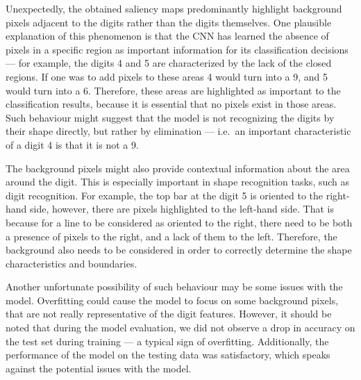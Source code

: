 \documentclass[journal, a4paper]{IEEEtran}
\begin{document}
Unexpectedly, the obtained saliency maps predominantly highlight background pixels adjacent to the digits
rather than the digits themselves.
One plausible explanation of this phenomenon is that the CNN has learned the absence of pixels in a specific region as
important information for its classification decisions --- for example, the digits 4 and 5 are characterized by the lack of the closed regions.
If one was to add pixels to these areas 4 would turn into a 9, and 5 would turn into a 6.
Therefore, these areas are highlighted as important to the classification results, because it is essential that no pixels exist in those areas.
Such behaviour might suggest that the model is not recognizing the digits by their shape directly, but rather by elimination --- i.e.\ an important characteristic of a digit 4 is that it is not a 9.

The background pixels might also provide contextual information about the area around the digit.
This is especially important in shape recognition tasks, such as digit recognition.
For example, the top bar at the digit 5 is oriented to the right-hand side, however, there are pixels highlighted to the left-hand side.
That is because for a line to be considered as oriented to the right, there need to be both a presence of pixels to the right, and a lack of them to the left.
Therefore, the background also needs to be considered in order to correctly determine the shape characteristics and boundaries.

Another unfortunate possibility of such behaviour may be some issues with the model.
Overfitting could cause the model to focus on some background pixels, that are not really representative of the digit features.
However, it should be noted that during the model evaluation, we did not observe a drop in accuracy on the test set during training --- a typical sign of overfitting.
Additionally, the performance of the model on the testing data was satisfactory, which speaks against the potential issues with the model.
\end{document}
